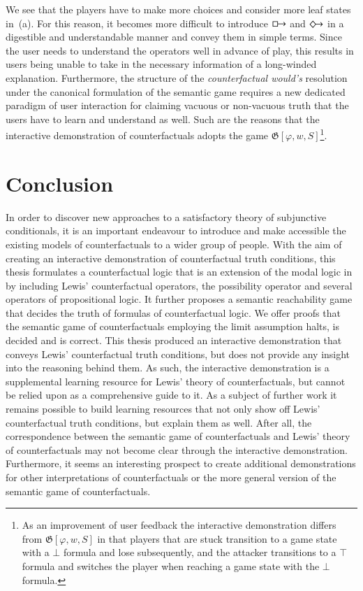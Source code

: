 \documentclass[a4paper,american,10pt]{paper}
\theoremstyle{definition}\newtheorem{lemma}[thm]{Lemma}
\theoremstyle{definition}\newtheorem{proposition}[thm]{Proposition}
\theoremstyle{definition}\newtheorem{corollary}[thm]{Corollary}
\theoremstyle{definition}\newtheorem{definition}{Definition}
\begin{document}
We see that the players have to make more choices and consider more leaf states in~(a). For this reason, it becomes more difficult to introduce $\boxright$ and $\Diamondright$ in a digestible and understandable manner and convey them in simple terms. Since the user needs to understand the operators well in advance of play, this results in users being unable to take in the necessary information of a long-winded explanation. Furthermore, the structure of the \textit{counterfactual would's} resolution under the canonical formulation of the semantic game requires a new dedicated paradigm of user interaction for claiming vacuous or non-vacuous truth that the users have to learn and understand as well. Such are the reasons that the interactive demonstration of counterfactuals adopts the game $\mathfrak{G}[\varphi ,w,S]$\footnote{As an improvement of user feedback the interactive demonstration differs from $\mathfrak{G}[\varphi ,w,S]$ in that players that are stuck transition to a game state with a $\bot$ formula and lose subsequently, and the attacker transitions to a $\top$ formula and switches the player when reaching a game state with the $\bot$ formula.}.
\newpage
\section{Conclusion}\label{sec:end}
In order to discover new approaches to a satisfactory theory of subjunctive conditionals, it is an important endeavour to introduce and make accessible the existing models of counterfactuals to a wider group of people. With the aim of creating an interactive demonstration of counterfactual truth conditions, this thesis formulates a counterfactual logic that is an extension of the modal logic in \cite{kripke_modal_logic_1963} by including Lewis' counterfactual operators, the possibility operator and several operators of propositional logic. It further proposes a semantic reachability game that decides the truth of formulas of counterfactual logic. We offer proofs that the semantic game of counterfactuals employing the limit assumption halts, is decided and is correct. This thesis produced an interactive demonstration that conveys Lewis' counterfactual truth conditions, but does not provide any insight into the reasoning behind them. As such, the interactive demonstration is a supplemental learning resource for Lewis' theory of counterfactuals, but cannot be relied upon as a comprehensive guide to it. As a subject of further work it remains possible to build learning resources that not only show off Lewis' counterfactual truth conditions, but explain them as well. After all, the correspondence between the semantic game of counterfactuals and Lewis' theory of counterfactuals may not become clear through the interactive demonstration. Furthermore, it seems an interesting prospect to create additional demonstrations for other interpretations of counterfactuals or the more general version of the semantic game of counterfactuals.

\nocite{*}

\end{document}

